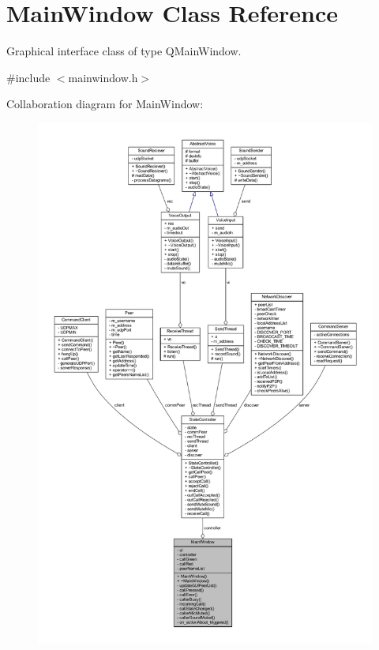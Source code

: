 \hypertarget{class_main_window}{
\section{\-Main\-Window \-Class \-Reference}
\label{class_main_window}
}


\-Graphical interface class of type \-Q\-Main\-Window.  




{\ttfamily \#include $<$mainwindow.\-h$>$}



\-Collaboration diagram for \-Main\-Window\-:\nopagebreak
\begin{figure}[H]
\begin{center}
\leavevmode
\includegraphics[width=350pt]{class_main_window__coll__graph}
\end{center}
\end{figure}
